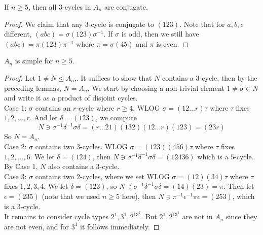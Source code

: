\begin{lemma}
    If $n\ge 5$, then all $3$-cycles in $A_n$ are conjugate.
\end{lemma}
\begin{proof}
    We claim that any $3$-cycle is conjugate to $(123)$.
    Note that for $a,b,c$ different, $(abc)=\sigma(123)\sigma^{-1}$.
    If $\sigma$ is odd, then we still have $(abc)=\pi(123)\pi^{-1}$ where $\pi=\sigma(45)$ and $\pi$ is even.
\end{proof}
\begin{theorem}
    $A_n$ is simple for $n\ge 5$.
\end{theorem}
\begin{proof}
    Let $1\neq N\unlhd A_n$,.
    It suffices to show that $N$ contains a $3$-cycle, then by the preceding lemmas, $N=A_n$.
    We start by choosing a non-trivial element $1\neq\sigma\in N$ and write it as a product of disjoint cycles.\\
    Case 1: $\sigma$ contains an $r$-cycle where $r\ge 4$.
    WLOG $\sigma=(12\ldots r)\tau$ where $\tau$ fixes $1,2,\ldots,r$.
    And let $\delta=(123)$, we compute
    $$N\ni\sigma^{-1}\delta^{-1}\sigma\delta=(r\ldots 21)(132)(12\ldots r)(123)=(23r)$$
    So $N=A_n$.\\
    Case 2: $\sigma$ contains two $3$-cycles.
    WLOG $\sigma=(123)(456)\tau$ where $\tau$ fixes $1,2,\ldots,6$.
    We let $\delta=(124)$, then $N\ni\sigma^{-1}\delta^{-1}\sigma\delta=(12436)$ which is a $5$-cycle.
    By Case 1, $N$ also contains a $3$-cycle.\\
    Case 3: $\sigma$ contains two $2$-cycles, where we set WLOG $\sigma=(12)(34)\tau$ where $\tau$ fixes $1,2,3,4$.
    We let $\delta=(123)$, so $N\ni\sigma^{-1}\delta^{-1}\sigma\delta=(14)(23)=\pi$.
    Then let $\epsilon=(235)$ (note that we used $n\ge 5$ here), then $N\ni\pi^{-1}\epsilon^{-1}\pi\epsilon=(253)$, which is a $3$-cycle.\\
    It remains to consider cycle types $2^1,3^1,2^13^1$.
    But $2^1,2^13^1$ are not in $A_n$ since they are not even, and for $3^1$ it follows immediately.
\end{proof}

